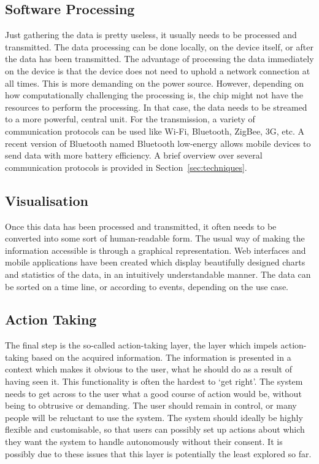\subsection{Software Processing} 
\label{sec:softwareProcessing}
Just gathering the data is pretty useless, it usually needs to be processed and transmitted. 
The data processing can be done locally, on the device itself, or after the data has been transmitted. 
The advantage of processing the data immediately on the device is that the device does not need to uphold a network connection at all times. 
This is more demanding on the power source. 
However, depending on how computationally challenging the processing is, the chip might not have the resources to perform the processing. 
In that case, the data needs to be streamed to a more powerful, central unit. 
For the transmission, a variety of communication protocols can be used like Wi-Fi, Bluetooth, ZigBee, 3G, etc. 
A recent version of Bluetooth named Bluetooth low-energy allows mobile devices to send data with more battery efficiency. A brief overview over several communication protocols is provided in Section~\ref{sec:techniques}.

\subsection{Visualisation}
\label{sec:visualisation}
Once this data has been processed and transmitted, it often needs to be converted into some sort of human-readable form. The usual way of making the information accessible is through a graphical representation. 
Web interfaces and mobile applications have been created which display beautifully designed charts and statistics of the data, in an intuitively understandable manner. 
The data can be sorted on a time line, or according to events, depending on the use case.

\subsection{Action Taking}
\label{actionTaking}
The final step is the so-called action-taking layer, the layer which impels action-taking based on the acquired information. 
The information is presented in a context which makes it obvious to the user, what he should do as a result of having seen it.
This functionality is often the hardest to `get right'. 
The system needs to get across to the user what a good course of action would be, without being to obtrusive or demanding. 
The user should remain in control, or many people will be reluctant to use the system. The system should ideally be highly flexible and customisable, so that users can possibly set up actions about which they want the system to handle autonomously without their consent. It is possibly due to these issues that this layer is potentially the least explored so far.


